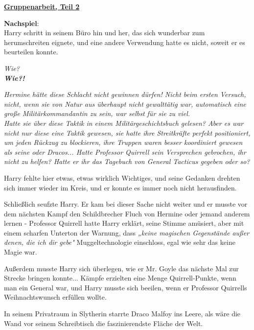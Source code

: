 

\hypertarget{gruppenarbeit-teil-2}{%

\textbf{\uline{Gruppenarbeit, Teil 2}}

\hfill\break \textbf{Nachspiel}:\\ Harry schritt in seinem Büro hin und her, das sich wunderbar zum herumschreiten eignete, und eine andere Verwendung hatte es nicht, soweit er es beurteilen konnte.

\emph{Wie?}\\ \textbf{\emph{Wie?!}}

\emph{Hermine hätte diese Schlacht nicht gewinnen dürfen! Nicht beim ersten Versuch, nicht, wenn sie von Natur aus überhaupt nicht gewalttätig war, automatisch eine große Militärkommandantin zu sein, war selbst für sie zu viel.}\\ \emph{\hfill\break Hatte sie über diese Taktik in einem Militärgeschichtsbuch gelesen? Aber es war nicht nur diese eine Taktik gewesen, sie hatte ihre Streitkräfte perfekt positioniert, um jeden Rückzug zu blockieren, ihre Truppen waren besser koordiniert gewesen als seine oder Dracos... Hatte Professor Quirrell sein Versprechen gebrochen, ihr nicht zu helfen? Hatte er ihr das Tagebuch von General Tacticus gegeben oder so?}

Harry fehlte hier etwas, etwas wirklich Wichtiges, und seine Gedanken drehten sich immer wieder im Kreis, und er konnte es immer noch nicht herausfinden.

Schließlich seufzte Harry. Er kam bei dieser Sache nicht weiter und er musste vor dem nächsten Kampf den Schildbrecher Fluch von Hermine oder jemand anderem lernen - Professor Quirrell hatte Harry erklärt, seine Stimme amüsiert, aber mit einem scharfen Unterton der Warnung, dass \emph{„keine magischen Gegenstände außer denen, die ich dir gebe"} Muggeltechnologie einschloss, egal wie sehr das keine Magie war.

Außerdem musste Harry sich überlegen, wie er Mr. Goyle das nächste Mal zur Strecke bringen konnte... Kämpfe erzielten eine Menge Quirrell-Punkte, wenn man ein General war, und Harry musste sich beeilen, wenn er Professor Quirrells Weihnachtswunsch erfüllen wollte.

In seinem Privatraum in Slytherin starrte Draco Malfoy ins Leere, als wäre die Wand vor seinem Schreibtisch die faszinierendste Fläche der Welt.

}

